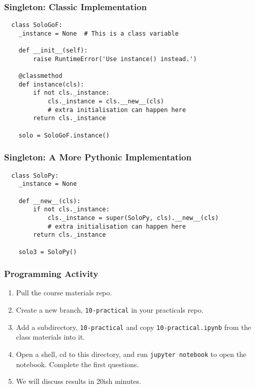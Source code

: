 \documentclass[10pt]{beamer}
\begin{document}
\begin{frame}[fragile]
  \frametitle{Singleton: Classic Implementation}

  \begin{verbatim}
  class SoloGoF:
    _instance = None  # This is a class variable

    def __init__(self):
        raise RuntimeError('Use instance() instead.')

    @classmethod
    def instance(cls):
        if not cls._instance:
            cls._instance = cls.__new__(cls)
            # extra initialisation can happen here
        return cls._instance
    
    solo = SoloGoF.instance()    

  \end{verbatim}
 \end{frame} 
\begin{frame}[fragile]
  \frametitle{Singleton: A More Pythonic Implementation}

  \begin{verbatim}
  class SoloPy:
    _instance = None

    def __new__(cls):
        if not cls._instance:
            cls._instance = super(SoloPy, cls).__new__(cls)
            # extra initialisation can happen here
        return cls._instance

    solo3 = SoloPy()
  \end{verbatim}

\end{frame}

\begin{frame}
  \frametitle{Programming Activity}
  
  \begin{enumerate}
    \item Pull the course materials repo.
    \item Create a new branch, \texttt{10-practical} in your practicals repo.
    \item Add a subdirectory,  \texttt{10-practical} and copy \texttt{10-practical.ipynb} from the class materials into it.
    \item Open a shell, cd to this directory, and run \texttt{jupyter notebook} to open the notebook. Complete the first questions.
    \item We will discuss results in 20ish minutes.
  \end{enumerate}      
\end{frame}
\end{document}

